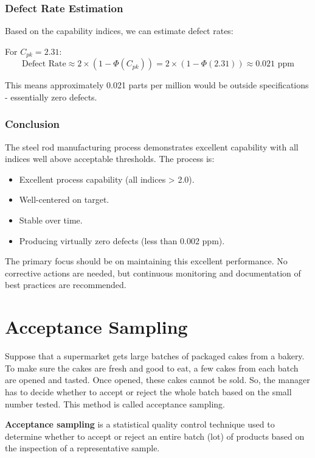 \documentclass[twoside]{book}
\begin{document}
\subsubsection{Defect Rate Estimation}

Based on the capability indices, we can estimate defect rates:

For $C_{pk} = 2.31$:
$$\text{Defect Rate} \approx 2 \times \left( 1-\Phi(C_{pk})\right)  = 2 \times(1- \Phi(2.31)) \approx 0.021 \text{ ppm}$$

This means approximately 0.021 parts per million would be outside specifications - essentially zero defects.

\subsubsection{Conclusion}

The steel rod manufacturing process demonstrates excellent capability with all indices well above acceptable thresholds. The process is:

\begin{itemize}
    \item Excellent process capability (all indices > 2.0).
    \item Well-centered on target.
    \item Stable over time.
    \item Producing virtually zero defects (less than 0.002 ppm).
\end{itemize}

The primary focus should be on maintaining this excellent performance. No corrective actions are needed, but continuous monitoring and documentation of best practices are recommended.



\section{Acceptance Sampling}

Suppose that a supermarket gets large batches of packaged cakes from a bakery. To make sure the cakes are fresh and good to eat, a few cakes from each batch are opened and tasted. Once opened, these cakes cannot be sold. So, the manager has to decide whether to accept or reject the whole batch based on the small number tested. This method is called acceptance sampling.

\begin{textbox}
\textbf{Acceptance sampling} is a statistical quality control technique used to determine whether to accept or reject an entire batch (lot) of products based on the inspection of a representative sample.
\end{textbox}
\end{document}
